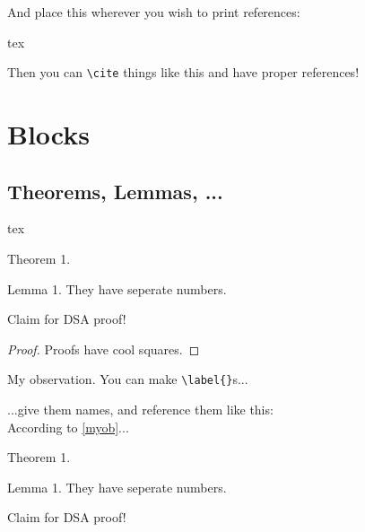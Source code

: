 \documentclass{fhw}
\begin{document}
And place this wherever you wish to print references:
\begin{Code}{tex}
\printbibliography
\end{Code}

Then you can \verb|\cite| things like this \cite{ecassoc} and have proper references!

\printbibliography


\section{Blocks}

\subsection{Theorems, Lemmas, ...}

\begin{Code}{tex}
\begin{theorem}
  Theorem 1. \blindtext
\end{theorem}

\begin{lemma}
  Lemma 1. They have seperate numbers.
\end{lemma}

\begin{claim}
  Claim for DSA proof!
\end{claim}

\begin{proof}
  Proofs have cool squares.
\end{proof}

\begin{observation}
  My observation. You can make \verb|\label{}|s...
  \label{myob}
\end{observation}

\begin{lemma}[My lemma]
  ...give them names, and reference them like this:\\
  According to \cref{myob}...
\end{lemma}
\end{Code}

\begin{theorem}
	Theorem 1. \blindtext
\end{theorem}

\begin{lemma}
	Lemma 1. They have seperate numbers.
\end{lemma}

\begin{claim}
  Claim for DSA proof!
\end{claim}
\end{document}
